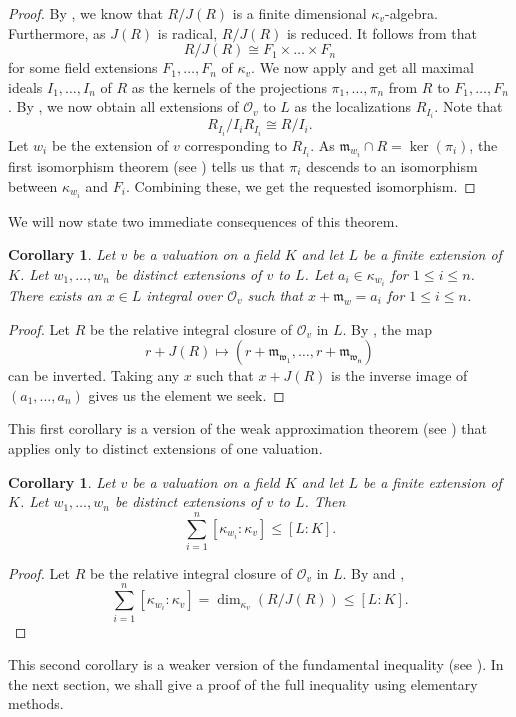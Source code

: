 \documentclass[12pt,a4paper]{amsart}
\newtheorem{cor}[thm]{Corollary}
\theoremstyle{definition}
\begin{document}
\begin{proof}
By , we know that $R/J(R)$ is a finite dimensional $\kappa_v$-algebra.
Furthermore, as $J(R)$ is radical, $R/J(R)$ is reduced.
It follows from  that $$R/J(R)\cong F_1\times\ldots\times F_n$$
for some field extensions $F_1,\ldots,F_n$ of $\kappa_v$.
We now apply  and get all maximal ideals $I_1,\ldots,I_n$ of $R$
as the kernels of the projections $\pi_1,\ldots,\pi_n$ from $R$ to $F_1,\ldots,F_n$.
By , we now obtain all extensions of $\mathcal{O}_v$ to $L$ as the localizations $R_{I_i}$.
Note that $$R_{I_i}/I_iR_{I_i}\cong R/I_{i}.$$
Let $w_i$ be the extension of $v$ corresponding to $R_{I_i}$.
As $\mathfrak{m}_{w_i}\cap R=\ker(\pi_i)$, the first isomorphism theorem (see \cite[page 243]{dummit2004}) tells us that $\pi_i$ descends to an isomorphism between $\kappa_{w_i}$ and $F_i$.
Combining these, we get the requested isomorphism.
\end{proof}

We will now state two immediate consequences of this theorem.
\begin{cor}{\label{weak}}
Let $v$ be a valuation on a field $K$ and let $L$ be a finite extension of $K$.
Let $w_1,\ldots,w_n$ be distinct extensions of $v$ to $L$.
Let $a_i\in\kappa_{w_i}$ for $1\leq i\leq n$.
There exists an $x\in L$ integral over $\mathcal{O}_v$ such that $x+\mathfrak{m}_w=a_i$ for $1\leq i\leq n$.
\end{cor}
\begin{proof}
Let $R$ be the relative integral closure of $\mathcal{O}_v$ in $L$.
By , the map
$$r+J(R)\mapsto (r+\mathfrak{m_{w_1}},\ldots,r+\mathfrak{m_{w_n}})$$
can be inverted.
Taking any $x$ such that $x+J(R)$ is the inverse image of $(a_1,\ldots,a_n)$ gives us the element we seek.
\end{proof}
This first corollary is a version of the weak approximation theorem (see \cite[Theorem 3.2.7]{engler2005valued}) that applies only to distinct extensions of one valuation.
\begin{cor}
Let $v$ be a valuation on a field $K$ and let $L$ be a finite extension of $K$.
Let $w_1,\ldots,w_n$ be distinct extensions of $v$ to $L$.
Then
$$\sum_{i=1}^n[\kappa_{w_i}:\kappa_v]\leq [L:K].$$
\end{cor}
\begin{proof}
Let $R$ be the relative integral closure of $\mathcal{O}_v$ in $L$.
By  and ,
$$\sum_{i=1}^n[\kappa_{w_i}:\kappa_v]=\dim_{\kappa_v}(R/J(R))\leq[L:K].$$
\end{proof}
This second corollary is a weaker version of the fundamental inequality (see \cite[Theorem 3.3.4]{engler2005valued}).
In the next section, we shall give a proof of the full inequality using elementary methods.
\end{document}
